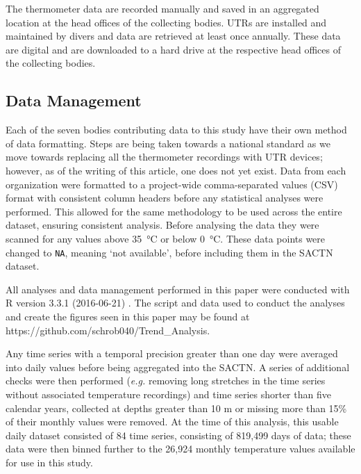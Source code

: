 \documentclass[]{ametsoc}
\begin{document}
The thermometer data are recorded manually and saved in an aggregated location at the head offices of the collecting bodies. UTRs are installed and maintained by divers and data are retrieved at least once annually. These data are digital and are downloaded to a hard drive at the respective head offices of the collecting bodies.

\subsection{Data Management}
Each of the seven bodies contributing data to this study have their own method of data formatting. Steps are being taken towards a national standard as we move towards replacing all the thermometer recordings with UTR devices; however, as of the writing of this article, one does not yet exist. Data from each organization were formatted to a project-wide comma-separated values (CSV) format with consistent column headers before any statistical analyses were performed. This allowed for the same methodology to be used across the entire dataset, ensuring consistent analysis. Before analysing the data they were scanned for any values above \SI{35}{\degreeCelsius} or below \SI{0}{\degreeCelsius}. These data points were changed to \texttt{NA}, meaning `not available', before including them in the SACTN dataset.

All analyses and data management performed in this paper were conducted with R version 3.3.1 (2016-06-21) \citep{R}. The script and data used to conduct the analyses and create the figures seen in this paper may be found at https://github.com/schrob040/Trend\_Analysis.

Any time series with a temporal precision greater than one day were averaged into daily values before being aggregated into the SACTN. A series of additional checks were then performed (\emph{e.g.} removing long stretches in the time series without associated temperature recordings) and time series shorter than five calendar years, collected at depths greater than 10 m or missing more than 15\% of their monthly values were removed. At the time of this analysis, this usable daily dataset consisted of 84 time series, consisting of 819,499 days of data; these data were then binned further to the 26,924 monthly temperature values available for use in this study.
\end{document}
